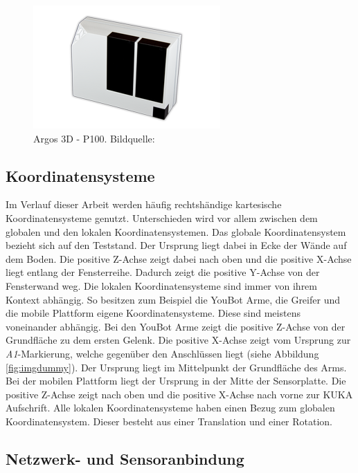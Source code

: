 \begin{figure}[H]
	\centering
	\includegraphics[scale=0.8]{fig/argos3d}   
	\caption[Argos 3D - P100]{Argos 3D - P100. Bildquelle: \cite{bluetechnix2015}}
	\label{fig:aufbau-argos3d}
\end{figure}

\subsection{Koordinatensysteme}
Im Verlauf dieser Arbeit werden häufig rechtshändige kartesische Koordinatensysteme genutzt. Unterschieden wird vor allem zwischen dem globalen und den lokalen Koordinatensystemen. Das globale Koordinatensystem bezieht sich auf den Teststand. Der Ursprung liegt dabei in Ecke der Wände auf dem Boden. Die positive Z-Achse zeigt dabei nach oben und die positive X-Achse liegt entlang der Fensterreihe. Dadurch zeigt die positive Y-Achse von der Fensterwand weg. Die lokalen Koordinatensysteme sind immer von ihrem Kontext abhängig. So besitzen zum Beispiel die YouBot Arme, die Greifer und die mobile Plattform eigene Koordinatensysteme. Diese sind meistens voneinander abhängig. Bei den YouBot Arme zeigt die positive Z-Achse von der Grundfläche zu dem ersten Gelenk. Die positive X-Achse zeigt vom Ursprung zur \textit{A1}-Markierung, welche gegenüber den Anschlüssen liegt (siehe Abbildung \ref{fig:imgdummy}). Der Ursprung liegt im Mittelpunkt der Grundfläche des Arms. Bei der mobilen Plattform liegt der Ursprung in der Mitte der Sensorplatte. Die positive Z-Achse zeigt nach oben und die positive X-Achse nach vorne zur KUKA Aufschrift. Alle lokalen Koordinatensysteme haben einen Bezug zum globalen Koordinatensystem. Dieser besteht aus einer Translation und einer Rotation.

\subsection{Netzwerk- und Sensoranbindung}

